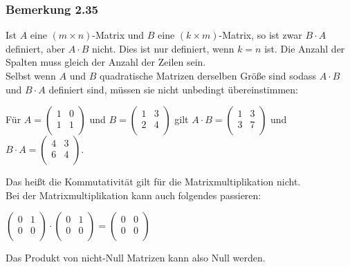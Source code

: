 \documentclass{article}
\begin{document}
\subsubsection*{Bemerkung 2.35}
Ist $A$ eine $(m \times n)$-Matrix und $B$ eine $(k \times m)$-Matrix, so ist zwar $B \cdot A$ definiert, aber $A \cdot B$ nicht. 
Dies ist nur definiert, wenn $k=n$ ist. Die Anzahl der Spalten muss gleich der Anzahl der Zeilen sein. \\
Selbst wenn $A$ und $B$ quadratische Matrizen derselben Größe sind sodass $A \cdot B$ und $B \cdot A$ definiert sind, müssen sie nicht unbedingt übereinstimmen: \\
\begin{center}
Für $A = \begin{pmatrix}
    1 & 0 \\
    1 & 1 \\
\end{pmatrix}$ und $B = \begin{pmatrix}
    1 & 3 \\
    2 & 4 \\
\end{pmatrix}$ gilt $A \cdot B = \begin{pmatrix}
    1 & 3 \\
    3 & 7 \\
\end{pmatrix}$ und $B \cdot A = \begin{pmatrix}
    4 & 3 \\
    6 & 4 \\
\end{pmatrix}$. 
\end{center}
Das heißt die Kommutativität gilt für die Matrixmultiplikation nicht. \\
Bei der Matrixmultiplikation kann auch folgendes passieren: \\
\begin{center}
    
$\begin{pmatrix}
    0 & 1 \\
    0 & 0 \\
\end{pmatrix} \cdot \begin{pmatrix}
    0 & 1 \\
    0 & 0 \\
\end{pmatrix} = \begin{pmatrix}
    0 & 0 \\
    0 & 0 \\
\end{pmatrix}$ 
\end{center}
Das Produkt von nicht-Null Matrizen kann also Null werden. \\
\\
\end{document}

